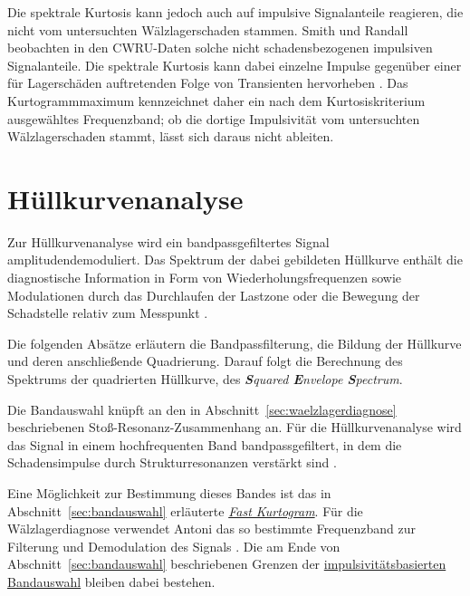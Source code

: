 Die spektrale Kurtosis kann jedoch auch auf impulsive Signalanteile reagieren,
die nicht vom untersuchten Wälzlagerschaden stammen. Smith und Randall
beobachten in den CWRU-Daten solche nicht schadensbezogenen impulsiven
Signalanteile. Die spektrale Kurtosis kann dabei einzelne Impulse gegenüber
einer für Lagerschäden auftretenden Folge von Transienten hervorheben
\cite[S.~122--123, Abschn.~6.6]{smithRollingElementBearing2015}.
Das Kurtogrammmaximum kennzeichnet daher ein nach dem Kurtosiskriterium
ausgewähltes Frequenzband; ob die dortige Impulsivität vom untersuchten
Wälzlagerschaden stammt, lässt sich daraus nicht ableiten.

\section{Hüllkurvenanalyse}
\label{sec:huellkurvenanalyse}


Zur Hüllkurvenanalyse wird ein bandpassgefiltertes Signal
amplitudendemoduliert. Das Spektrum der dabei gebildeten Hüllkurve enthält
die diagnostische Information in Form von Wiederholungsfrequenzen sowie
Modulationen durch das Durchlaufen der Lastzone oder die Bewegung der
Schadstelle relativ zum Messpunkt
\cite[S.~506--507, Abschn.~5, Abb.~25]
{randallRollingElementBearing2011a}.

Die folgenden Absätze erläutern die Bandpassfilterung, die Bildung der
Hüllkurve und deren anschließende Quadrierung. Darauf folgt die Berechnung
des Spektrums der quadrierten Hüllkurve, des
\emph{\textbf{S}quared \textbf{E}nvelope \textbf{S}pectrum}.


Die Bandauswahl knüpft an den in Abschnitt~\ref{sec:waelzlagerdiagnose}
beschriebenen Stoß-Resonanz-Zusammenhang an.
Für die Hüllkurvenanalyse wird das
Signal in einem hochfrequenten Band bandpassgefiltert, in dem die
Schadensimpulse durch Strukturresonanzen verstärkt sind
\cite[S.~506, Abschn.~5, erster Absatz]
{randallRollingElementBearing2011a}.

Eine Möglichkeit zur Bestimmung dieses Bandes ist das in
Abschnitt~\ref{sec:bandauswahl} erläuterte
\hyperref[par:kurtogramm_fast_kurtogram]{\emph{Fast Kurtogram}}. Für die
Wälzlagerdiagnose verwendet Antoni das so bestimmte Frequenzband zur
Filterung und Demodulation des Signals
\cite[S.~119, Abschn.~4.2, erster Absatz]
{antoniFastComputationKurtogram2007}.
Die am Ende von Abschnitt~\ref{sec:bandauswahl} beschriebenen Grenzen der
\hyperref[sec:bandauswahl]
{impulsivitätsbasierten Bandauswahl} bleiben dabei bestehen.

